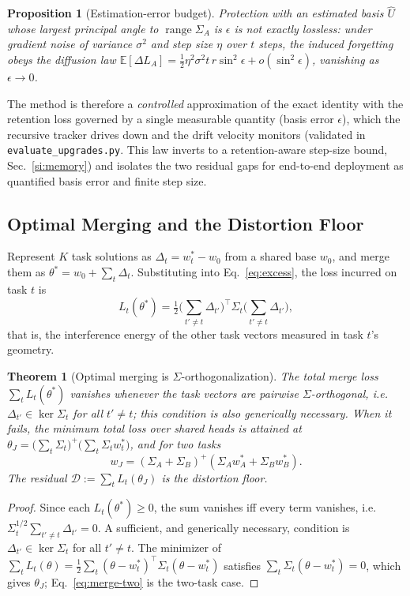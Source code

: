 \documentclass[10pt,a4paper]{article}
\theoremstyle{plain}
\newtheorem{theorem}{Theorem}
\newtheorem{proposition}{Proposition}
\theoremstyle{definition}
\newcommand{\Sig}{\Sigma}
\newcommand{\Del}{\Delta}
\DeclareMathOperator{\range}{range}
\begin{document}
\begin{proposition}[Estimation-error budget]
\label{prop:esterror}
Protection with an \emph{estimated} basis $\hat U$ whose largest principal angle to
$\range\Sig_A$ is $\epsilon$ is not exactly lossless: under gradient noise of variance
$\sigma^2$ and step size $\eta$ over $t$ steps, the induced forgetting obeys the
diffusion law $\mathbb{E}[\Del L_A]=\tfrac12\eta^2\sigma^2 t\,r\sin^2\epsilon+o(\sin^2\epsilon)$,
vanishing as $\epsilon\to0$.
\end{proposition}
\noindent The method is therefore a \emph{controlled} approximation of the exact
identity with the retention loss governed by a single measurable
quantity (basis error $\epsilon$), which the recursive tracker drives down and the
drift velocity monitors (validated in \texttt{evaluate\_upgrades.py}. This law inverts to
a retention-aware step-size bound, Sec.~\ref{si:memory}) and isolates the two residual
gaps for end-to-end deployment as quantified basis error and finite step size.

\subsection{Optimal Merging and the Distortion Floor}
\label{sec:theory:merge}
Represent $K$ task solutions as $\Del_t=w_t^\ast-w_0$ from a shared base $w_0$, and
merge them as $\theta^\ast=w_0+\sum_t\Del_t$. Substituting into
Eq.~\eqref{eq:excess}, the loss incurred on task $t$ is
\begin{equation}
L_t(\theta^\ast)=\tfrac12\Big(\textstyle\sum_{t'\neq t}\Del_{t'}\Big)^{\!\top}
\Sig_t\Big(\textstyle\sum_{t'\neq t}\Del_{t'}\Big),
\label{eq:merge-energy}
\end{equation}
that is, the interference energy of the other task vectors measured in task $t$'s
geometry.

\begin{theorem}[Optimal merging is $\Sig$-orthogonalization]
\label{thm:merge}
The total merge loss $\sum_t L_t(\theta^\ast)$ vanishes whenever the task vectors are
pairwise $\Sig$-orthogonal, i.e. $\Del_{t'}\in\ker\Sig_t$ for all $t'\neq t$; this
condition is also generically necessary. When it fails, the minimum total loss over
shared heads is attained at
$\theta_J=\big(\sum_t\Sig_t\big)^{+}\big(\sum_t\Sig_t w_t^\ast\big)$, and for two
tasks
\begin{equation}
w_J=(\Sig_A+\Sig_B)^{+}(\Sig_A w_A^\ast+\Sig_B w_B^\ast).
\label{eq:merge-two}
\end{equation}
The residual $\mathcal{D}:=\sum_t L_t(\theta_J)$ is the \emph{distortion floor}.
\end{theorem}
\begin{proof}
Since each $L_t(\theta^\ast)\ge0$, the sum vanishes iff every term vanishes, i.e.
$\Sig_t^{1/2}\sum_{t'\neq t}\Del_{t'}=0$. A sufficient, and generically necessary,
condition is $\Del_{t'}\in\ker\Sig_t$ for all $t'\neq t$. The minimizer of $\sum_t
L_t(\theta)=\tfrac12\sum_t(\theta-w_t^\ast)^\top\Sig_t(\theta-w_t^\ast)$ satisfies
$\sum_t\Sig_t(\theta-w_t^\ast)=0$, which gives $\theta_J$; Eq.~\eqref{eq:merge-two} is
the two-task case.
\end{proof}
\end{document}
